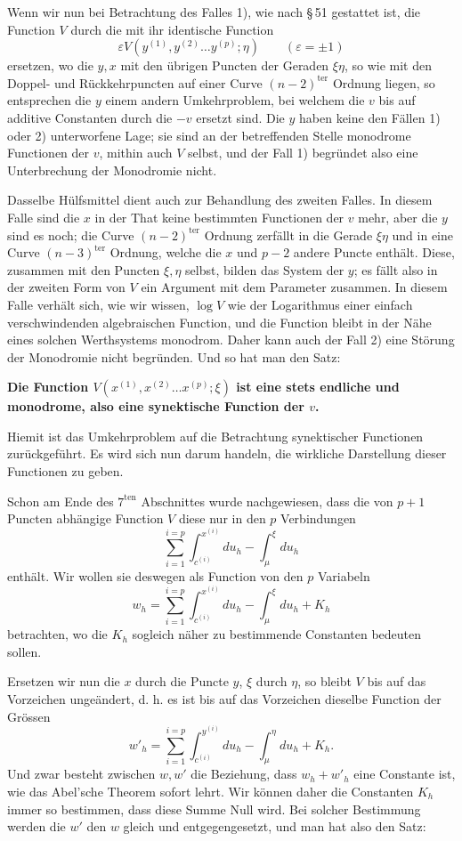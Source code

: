 \documentclass[10pt]{article}
\begin{document}
Wenn wir nun bei Betrachtung des Falles 1), wie nach \S\,51 gestattet ist, die Function \(V\) durch die mit ihr identische Function
\[
\varepsilon V(y^{(1)},y^{(2)}\ldots y^{(p)};\eta)\qquad(\varepsilon=\pm1)
\]
ersetzen, wo die \(y,x\) mit den übrigen Puncten der Geraden \(\xi\eta\), so wie mit den Doppel- und Rückkehrpuncten auf einer Curve \((n-2)^{\mathrm{ter}}\) Ordnung liegen, so entsprechen die \(y\) einem andern Umkehrproblem, bei welchem die \(v\) bis auf additive Constanten durch die \(-v\) ersetzt sind. Die \(y\) haben keine den Fällen 1) oder 2) unterworfene Lage; sie sind an der betreffenden Stelle monodrome Functionen der \(v\), mithin auch \(V\) selbst, und der Fall 1) begründet also eine Unterbrechung der Monodromie nicht.

Dasselbe Hülfsmittel dient auch zur Behandlung des zweiten Falles. In diesem Falle sind die \(x\) in der That keine bestimmten Functionen der \(v\) mehr, aber die \(y\) sind es noch; die Curve \((n-2)^{\mathrm{ter}}\) Ordnung zerfällt in die Gerade \(\xi\eta\) und in eine Curve \((n-3)^{\mathrm{ter}}\) Ordnung, welche die \(x\) und \(p-2\) andere Puncte enthält. Diese, zusammen mit den Puncten \(\xi,\eta\) selbst, bilden das System der \(y\); es fällt also in der zweiten Form von \(V\) ein Argument mit dem Parameter zusammen. In diesem Falle verhält sich, wie wir wissen, \(\log V\) wie der Logarithmus einer einfach verschwindenden algebraischen Function, und die Function bleibt in der Nähe eines solchen Werthsystems monodrom. Daher kann auch der Fall 2) eine Störung der Monodromie nicht begründen. Und so hat man den Satz:

\textbf{Die Function \(V(x^{(1)},x^{(2)}\ldots x^{(p)};\xi)\) ist eine stets endliche und monodrome, also eine synektische Function der \(v\).}

Hiemit ist das Umkehrproblem auf die Betrachtung synektischer Functionen zurückgeführt. Es wird sich nun darum handeln, die wirkliche Darstellung dieser Functionen zu geben.

Schon am Ende des \(7^{\mathrm{ten}}\) Abschnittes wurde nachgewiesen, dass die von \(p+1\) Puncten abhängige Function \(V\) diese nur in den \(p\) Verbindungen
\[
\sum_{i=1}^{i=p}\int_{c^{(i)}}^{x^{(i)}}du_h-\int_{\mu}^{\xi}du_h
\]
enthält. Wir wollen sie deswegen als Function von den \(p\) Variabeln
\[
w_h=\sum_{i=1}^{i=p}\int_{c^{(i)}}^{x^{(i)}}du_h-\int_{\mu}^{\xi}du_h+K_h
\]
betrachten, wo die \(K_h\) sogleich näher zu bestimmende Constanten bedeuten sollen.

Ersetzen wir nun die \(x\) durch die Puncte \(y\), \(\xi\) durch \(\eta\), so bleibt \(V\) bis auf das Vorzeichen ungeändert, d. h. es ist bis auf das Vorzeichen dieselbe Function der Grössen
\[
w'_h=\sum_{i=1}^{i=p}\int_{c^{(i)}}^{y^{(i)}}du_h-\int_{\mu}^{\eta}du_h+K_h.
\]
Und zwar besteht zwischen \(w,w'\) die Beziehung, dass \(w_h+w'_h\) eine Constante ist, wie das Abel'sche Theorem sofort lehrt. Wir können daher die Constanten \(K_h\) immer so bestimmen, dass diese Summe Null wird. Bei solcher Bestimmung werden die \(w'\) den \(w\) gleich und entgegengesetzt, und man hat also den Satz:
\end{document}
